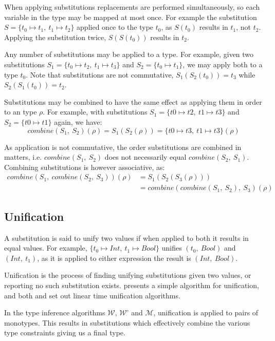 \documentclass[a4paper,fleqn,oneside,12pt]{report}
\newcommand{\W}{$\mathcal{W}$}
\newcommand{\M}{$\mathcal{M}$}
\begin{document}
When applying substitutions replacements are performed simultaneously, so each variable in the type may be mapped at most once. For example the substitution $S = \{ t_0 \mapsto t_1,\ t_1 \mapsto t_2 \}$ applied once to the type $t_0$, as $S(t_0)$ results in $t_1$, not $t_2$. Applying the substitution twice, $S(S(t_0))$ results in $t_2$.

Any number of substitutions may be applied to a type. For example, given two substitutions $S_1 = \{ t_0 \mapsto t_2,\ t_1 \mapsto t_3 \}$ and $S_2 = \{ t_0 \mapsto t_1 \}$, we may apply both to a type $t_0$. Note that substitutions are not commutative, $S_1(S_2(t_0)) = t_3$ while $S_2(S_1(t_0)) = t_2$.

Substitutions may be combined to have the same effect as applying them in order to an type $\rho$. For example, with substitutions $S_1 = \{ t0 \mapsto t2,\ t1 \mapsto t3 \}$ and $S_2 = \{ t0 \mapsto t1 \}$ again, we have:
$$\mathit{combine}(S_1,\ S_2)(\rho) = S_1(S_2(\rho)) = \{ t0 \mapsto t3,\ t1 \mapsto t3 \}(\rho)$$

As application is not commutative, the order substitutions are combined in matters, i.e. $\mathit{combine}(S_1,\ S_2)$ does not necessarily equal $\mathit{combine}(S_2,\ S_1)$. Combining substitutions is however associative, as:
\begin{align*}
  \mathit{combine}(S_1,\ \mathit{combine}(S_2,\ S_3))(\rho) & = S_1(S_2(S_3(\rho)))\\& = \mathit{combine}(\mathit{combine}(S_1,\ S_2),\ S_3)(\rho)
\end{align*}

\subsection{Unification}

A substitution is said to unify two values if when applied to both it results in equal values. For example, $\{ t_0 \mapsto Int,\ t_1 \mapsto Bool \}$ unifies $(t_0,\ Bool)$ and $(Int,\ t_1)$, as it is applied to either expression the result is $(Int,\ Bool)$.

Unification is the process of finding unifying substitutions given two values, or reporting no such substitution exists. \cite{ref29} presents a simple algorithm for unification, and both \cite{ref30} and \cite{ref31} set out linear time unification algorithms.

In the type inference algorithms \W, \W’ and \M, unification is applied to pairs of monotypes. This results in substitutions which effectively combine the various type constraints giving us a final type.
\end{document}
